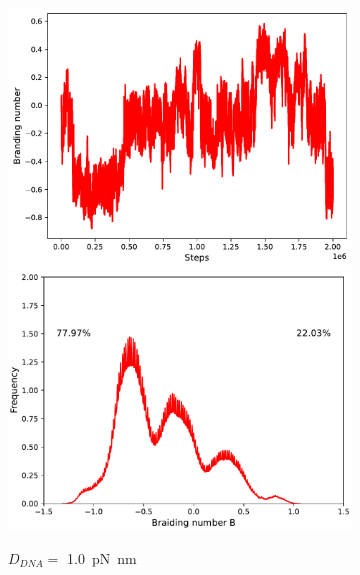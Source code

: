 \documentclass[a4paper,10pt]{article}
\begin{document}
\begin{figure}[tb]
\begin{subfigure}{.3\textwidth}
\includegraphics[width=\textwidth]{brD_100_brand.pdf}
\includegraphics[width=\textwidth]{brD_100_br_pr.pdf}
\caption{$D_{DNA}=$ \SI{1.0}{\pico\newton\nano\meter}}
\label{fig:braD_b}
\end{subfigure}
\begin{subfigure}{.3\textwidth}

\end{subfigure}
\end{figure}
\end{document}
